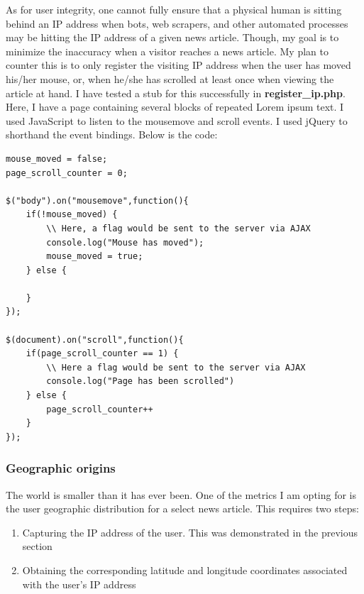 \documentclass[12pt]{article}
\begin{document}
As for user integrity, one cannot fully ensure that a physical human is sitting behind an IP address when bots, web scrapers, and other automated processes may be hitting the IP address of a given news article. Though, my goal is to minimize the inaccuracy when a visitor reaches a news article. My plan to counter this is to only register the visiting IP address when the user has moved his/her mouse, or, when he/she has scrolled at least once when viewing the article at hand. I have tested a stub for this successfully in \textbf{register\_ip.php}. Here, I have a page containing several blocks of repeated Lorem ipsum text. I used JavaScript to listen to the mousemove and scroll events. I used jQuery to shorthand the event bindings. Below is the code:
\begin{lstlisting}
mouse_moved = false;
page_scroll_counter = 0;

$("body").on("mousemove",function(){
	if(!mouse_moved) {
		\\ Here, a flag would be sent to the server via AJAX
		console.log("Mouse has moved");
		mouse_moved = true;
	} else {
		
	}
});

$(document).on("scroll",function(){
	if(page_scroll_counter == 1) {
		\\ Here a flag would be sent to the server via AJAX
		console.log("Page has been scrolled")
	} else {
		page_scroll_counter++
	}
});
\end{lstlisting}        

\subsubsection{Geographic origins}
The world is smaller than it has ever been. One of the metrics I am opting for is the user geographic distribution for a select news article. This requires two steps:
\begin{enumerate}
\item Capturing the IP address of the user. This was demonstrated in the previous section
\item Obtaining the corresponding latitude and longitude coordinates associated with the user's IP address
\end{enumerate}
\end{document}
